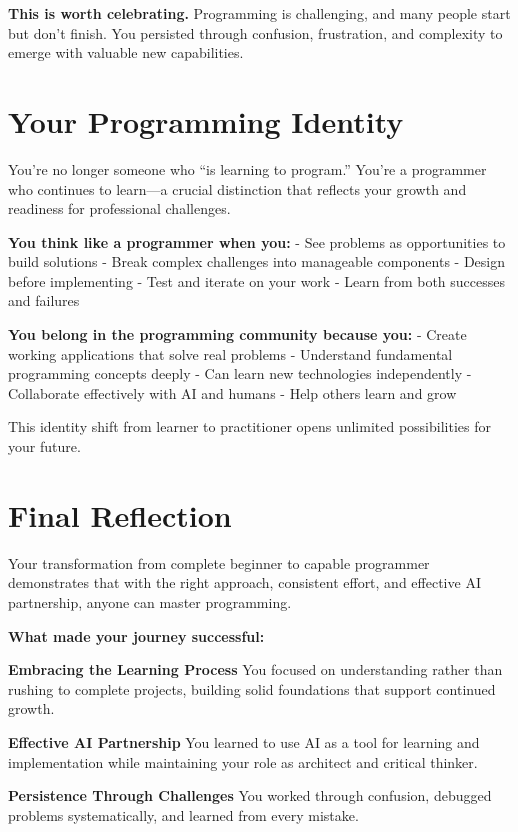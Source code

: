 \documentclass[
  letterpaper,
  DIV=11,
  numbers=noendperiod,
  oneside]{scrreprt}
\begin{document}
\textbf{This is worth celebrating.} Programming is challenging, and many
people start but don't finish. You persisted through confusion,
frustration, and complexity to emerge with valuable new capabilities.

\section{Your Programming Identity}\label{your-programming-identity}

You're no longer someone who ``is learning to program.'' You're a
programmer who continues to learn---a crucial distinction that reflects
your growth and readiness for professional challenges.

\textbf{You think like a programmer when you:} - See problems as
opportunities to build solutions - Break complex challenges into
manageable components - Design before implementing - Test and iterate on
your work - Learn from both successes and failures

\textbf{You belong in the programming community because you:} - Create
working applications that solve real problems - Understand fundamental
programming concepts deeply - Can learn new technologies independently -
Collaborate effectively with AI and humans - Help others learn and grow

This identity shift from learner to practitioner opens unlimited
possibilities for your future.

\section{Final Reflection}\label{final-reflection}

Your transformation from complete beginner to capable programmer
demonstrates that with the right approach, consistent effort, and
effective AI partnership, anyone can master programming.

\textbf{What made your journey successful:}

\textbf{Embracing the Learning Process} You focused on understanding
rather than rushing to complete projects, building solid foundations
that support continued growth.

\textbf{Effective AI Partnership} You learned to use AI as a tool for
learning and implementation while maintaining your role as architect and
critical thinker.

\textbf{Persistence Through Challenges} You worked through confusion,
debugged problems systematically, and learned from every mistake.
\end{document}
